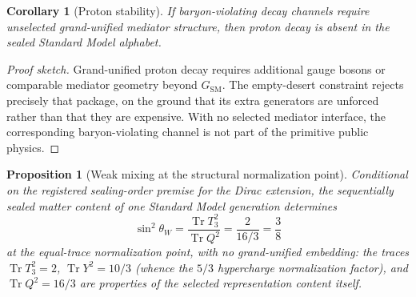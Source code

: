 \documentclass[11pt]{article}
\theoremstyle{plain}
\newtheorem{proposition}[theorem]{Proposition}
\newtheorem{corollary}[theorem]{Corollary}
\theoremstyle{definition}
\theoremstyle{remark}
\newenvironment{proofsketch}{\begin{proof}[Proof sketch]}{\end{proof}}
\newcommand{\Tr}{\operatorname{Tr}}
\begin{document}
\begin{corollary}[Proton stability]
If baryon-violating decay channels require unselected grand-unified mediator structure, then proton decay is absent in the sealed Standard Model alphabet.
\end{corollary}

\begin{proofsketch}
Grand-unified proton decay requires additional gauge bosons or comparable mediator geometry beyond \(G_{\mathrm{SM}}\). The empty-desert constraint rejects precisely that package, on the ground that its extra generators are unforced rather than that they are expensive. With no selected mediator interface, the corresponding baryon-violating channel is not part of the primitive public physics.
\end{proofsketch}

\begin{proposition}[Weak mixing at the structural normalization point]
Conditional on the registered sealing-order premise for the Dirac extension, the sequentially sealed matter content of one Standard Model generation determines
\[
\sin^2\theta_W
=\frac{\Tr T_3^2}{\Tr Q^2}
=\frac{2}{16/3}
=\frac{3}{8}
\]
at the equal-trace normalization point, with no grand-unified embedding: the traces \(\Tr T_3^2=2\), \(\Tr Y^2=10/3\) (whence the \(5/3\) hypercharge normalization factor), and \(\Tr Q^2=16/3\) are properties of the selected representation content itself.
\end{proposition}
\end{document}
